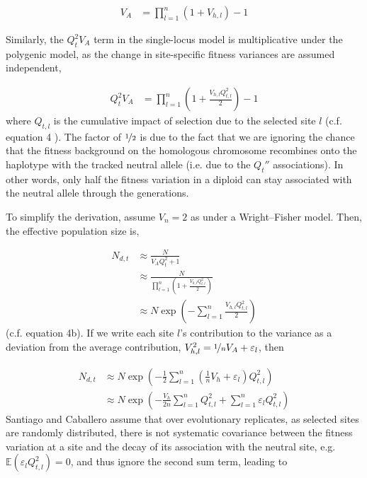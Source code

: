 \documentclass[11pt]{article}
\newcommand{\E}{\mathbb{E}}
\newcommand{\V}{\text{V}}
\begin{document}
\begin{align}
  V_A %
      &= \prod_{l=1}^n (1 + V_{h,l})  - 1
\end{align}

Similarly, the $Q_t^2 V_A$ term in the single-locus model is multiplicative
under the polygenic model, as the change in site-specific fitness variances are
assumed independent,

\begin{align}
  Q_t^2 V_A &= \prod_{l=1}^n \left(1 + \frac{V_{h,l} Q_{t,l}^2}{2}\right)  - 1
\end{align}
%
where $Q_{t,l}$ is the cumulative impact of selection due to the selected site
$l$ (c.f. equation 4 \cite{Santiago1998-bs}). The factor of $\nicefrac{1}{2}$
is due to the fact that we are ignoring the chance that the fitness background
on the homologous chromosome recombines onto the haplotype with the tracked
neutral allele (i.e. due to the $Q_t''$ associations). In other words, only
half the fitness variation in a diploid can stay associated with the neutral
allele through the generations.

To simplify the derivation, assume $V_n = 2$ as under a Wright--Fisher model.
Then, the effective population size is,

\begin{align}
  N_{d,t} &\approx \frac{N}{V_A Q_t^2 + 1} \nonumber \\
          &\approx \frac{N}{\prod_{l=1}^n \left(1 + \frac{V_{h,l} Q_{t,l}^2}{2}\right)} \nonumber \\
          &\approx N \exp\left(- \sum_{l=1}^n \frac{V_{h,l} Q_{t,l}^2}{2}\right)
\end{align}
%
(c.f. \cite{Santiago1998-bs} equation 4b). If we write each site $l$'s
contribution to the variance as a deviation from the average contribution,
$V_{h,l}^2 = \nicefrac{1}{n} V_A + \varepsilon_l$, then 

\begin{align}
  N_{d,t} &\approx N \exp\left(- \frac{1}{2}\sum_{l=1}^n \left(\frac{1}{n}V_{h} + \varepsilon_l\right)  Q_{t,l}^2\right) \nonumber \\
          &\approx N \exp\left(- \frac{V_{h}}{2n} \sum_{l=1}^n Q_{t,l}^2+ \sum_{l=1}^n \varepsilon_l  Q_{t,l}^2\right)
\end{align}
%
Santiago and Caballero assume that over evolutionary replicates, as selected
sites are randomly distributed, there is not systematic covariance between the
fitness variation at a site and the decay of its association with the neutral
site, e.g. $\E(\varepsilon_l Q_{t,l}^2) = 0$, and thus ignore the second sum
term, leading to
\end{document}
